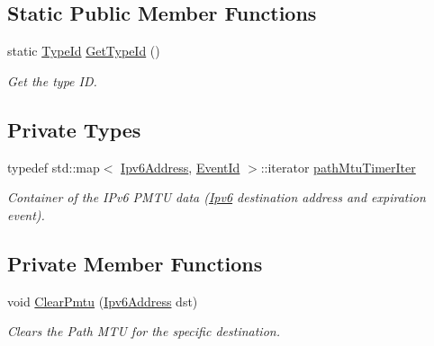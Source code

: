 \subsection*{Static Public Member Functions}
\begin{DoxyCompactItemize}
\item 
static \hyperlink{classns3_1_1TypeId}{Type\+Id} \hyperlink{classns3_1_1Ipv6PmtuCache_a9759ebeb559d35604c9333c8f75872fe}{Get\+Type\+Id} ()
\begin{DoxyCompactList}\small\item\em Get the type ID. \end{DoxyCompactList}\end{DoxyCompactItemize}
\subsection*{Private Types}
\begin{DoxyCompactItemize}
\item 
typedef std\+::map$<$ \hyperlink{classns3_1_1Ipv6Address}{Ipv6\+Address}, \hyperlink{classns3_1_1EventId}{Event\+Id} $>$\+::iterator \hyperlink{classns3_1_1Ipv6PmtuCache_a5afa87d14a8abfe75e98be4c29b13ca0}{path\+Mtu\+Timer\+Iter}
\begin{DoxyCompactList}\small\item\em Container of the I\+Pv6 P\+M\+TU data (\hyperlink{classns3_1_1Ipv6}{Ipv6} destination address and expiration event). \end{DoxyCompactList}\end{DoxyCompactItemize}
\subsection*{Private Member Functions}
\begin{DoxyCompactItemize}
\item 
void \hyperlink{classns3_1_1Ipv6PmtuCache_a5f825f445683f672180781355fad6a7a}{Clear\+Pmtu} (\hyperlink{classns3_1_1Ipv6Address}{Ipv6\+Address} dst)
\begin{DoxyCompactList}\small\item\em Clears the Path M\+TU for the specific destination. \end{DoxyCompactList}\end{DoxyCompactItemize}
